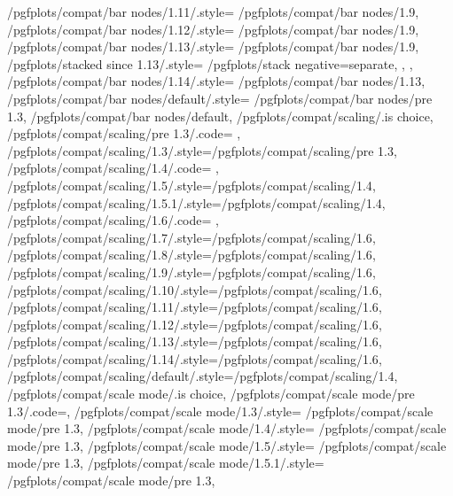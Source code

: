 {	/pgfplots/compat/bar nodes/1.11/.style=		{/pgfplots/compat/bar nodes/1.9},%
	/pgfplots/compat/bar nodes/1.12/.style=		{/pgfplots/compat/bar nodes/1.9},%
	/pgfplots/compat/bar nodes/1.13/.style=		{
		/pgfplots/compat/bar nodes/1.9,
		/pgfplots/stacked since 1.13/.style={
			/pgfplots/stack negative=separate,
		},%
	},%
	/pgfplots/compat/bar nodes/1.14/.style=		{/pgfplots/compat/bar nodes/1.13},%
	/pgfplots/compat/bar nodes/default/.style=	{/pgfplots/compat/bar nodes/pre 1.3},%
	/pgfplots/compat/bar nodes/default,
	/pgfplots/compat/scaling/.is choice,
	/pgfplots/compat/scaling/pre 1.3/.code={%
		\def\pgfplots@compat@scaling@zunitfix@enable{0}%
		\def\pgfplots@compat@scaling@coordmath{pgfbasic}%
		\def\pgfplots@compat@scaling@coordmath@final{pgfbasic}%
	},
	/pgfplots/compat/scaling/1.3/.style={/pgfplots/compat/scaling/pre 1.3},
	/pgfplots/compat/scaling/1.4/.code={%
		\def\pgfplots@compat@scaling@zunitfix@enable{1}%
		\def\pgfplots@compat@scaling@coordmath{float}%
		\def\pgfplots@compat@scaling@coordmath@final{pgfbasic}%
	},
	/pgfplots/compat/scaling/1.5/.style={/pgfplots/compat/scaling/1.4},
	/pgfplots/compat/scaling/1.5.1/.style={/pgfplots/compat/scaling/1.4},
	/pgfplots/compat/scaling/1.6/.code={%
		\def\pgfplots@compat@scaling@zunitfix@enable{1}%
		\def\pgfplots@compat@scaling@coordmath{float}%
		\def\pgfplots@compat@scaling@coordmath@final{float}%
	},
	/pgfplots/compat/scaling/1.7/.style={/pgfplots/compat/scaling/1.6},
	/pgfplots/compat/scaling/1.8/.style={/pgfplots/compat/scaling/1.6},
	/pgfplots/compat/scaling/1.9/.style={/pgfplots/compat/scaling/1.6},
	/pgfplots/compat/scaling/1.10/.style={/pgfplots/compat/scaling/1.6},
	/pgfplots/compat/scaling/1.11/.style={/pgfplots/compat/scaling/1.6},
	/pgfplots/compat/scaling/1.12/.style={/pgfplots/compat/scaling/1.6},
	/pgfplots/compat/scaling/1.13/.style={/pgfplots/compat/scaling/1.6},
	/pgfplots/compat/scaling/1.14/.style={/pgfplots/compat/scaling/1.6},
	/pgfplots/compat/scaling/default/.style={/pgfplots/compat/scaling/1.4},
	/pgfplots/compat/scale mode/.is choice,
	/pgfplots/compat/scale mode/pre 1.3/.code=\def\pgfplots@compat@scale@mode@compatible@mode{1},%
	/pgfplots/compat/scale mode/1.3/.style=		{/pgfplots/compat/scale mode/pre 1.3},
	/pgfplots/compat/scale mode/1.4/.style=		{/pgfplots/compat/scale mode/pre 1.3},
	/pgfplots/compat/scale mode/1.5/.style=	 	{/pgfplots/compat/scale mode/pre 1.3},
	/pgfplots/compat/scale mode/1.5.1/.style=	{/pgfplots/compat/scale mode/pre 1.3},
}
